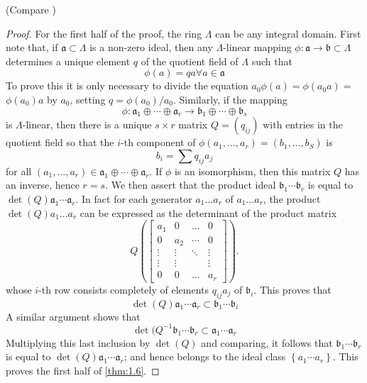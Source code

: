 (Compare \cite{kaplansky:1952})

\begin{proof}
For the first half of the proof, the ring $\Lambda$ can be any integral domain. First note that, if $\mathfrak{a} \subset \Lambda$ is a non-zero ideal, then any $\Lambda$-linear mapping $\phi: \mathfrak{a} \to \mathfrak{b} \subset \Lambda$ determines a unique element $q$ of the quotient field of $\Lambda$ such that
\[
	\phi(a)=q a \forall a \in \mathfrak{a}
\]
To prove this it is only necessary to divide the equation $a_{0} \phi(a)=\phi\left(a_{0} a\right)=$ $\phi\left(a_{0}\right) a$ by $a_{0}$, setting $q=\phi\left(a_{0}\right) / a_{0}$. Similarly, if the mapping
\[
\phi: \mathfrak{a}_{1} \oplus \cdots \oplus \mathfrak{a}_{r} \to \mathfrak{b}_{1} \oplus \cdots \oplus \mathfrak{b}_{s}
\]
is $\Lambda$-linear, then there is a unique $s \times r$ matrix $Q=\left(q_{ij}\right)$ with entries in the quotient field so that the $i$-th component of $\phi\left(a_{1}, \ldots, a_{r}\right)=\left(b_{1}, \ldots, b_{S}\right)$ is
\[
b_{i}=\sum q_{i j} a_{j}
\]
for all $\left(a_{1}, \ldots, a_{r}\right) \in \mathfrak{a}_{1} \oplus \cdots \oplus \mathfrak{a}_{r}$. If $\phi$ is an isomorphism, then this matrix $Q$ has an inverse, hence $r=s$. We then assert that the product ideal $\mathfrak{b}_{1} \cdots \mathfrak{b}_{r}$ is equal to $\det(Q) \mathfrak{a}_{1} \cdots \mathfrak{a}_{r}$. In fact for each generator $a_{1} \ldots a_{r}$ of $a_{1} \ldots a_{r}$, the product $\det(Q) a_{1} \ldots a_{r}$ can be expressed as the determinant of the product matrix
\[
Q
\left(\begin{bmatrix}
a_{1} & 0 & \ldots & 0 \\
0 & a_{2} & \cdots & 0 \\
\vdots & \vdots & \ddots & \vdots \\
\vdots & \vdots & & \vdots \\
0 & 0 & \ldots & a_{r}
\end{bmatrix}\right).
\]
whose $i$-th row consists completely of elements $q_{i j} a_{j}$ of $\mathfrak{b}_{i}$. This proves that
\[
	\det(Q) \mathfrak{a}_{1} \cdots \mathfrak{a}_{r} \subset \mathfrak{b}_{1} \cdots \mathfrak{b}_{i}
\]
A similar argument shows that
\[
\det(Q^{-1} \mathfrak{b}_{1} \cdots \mathfrak{b}_{r} \subset \mathfrak{a}_{1} \cdots \mathfrak{a}_{r}
\]
Multiplying this last inclusion by $\det(Q)$ and comparing, it follows that $\mathfrak{b}_{1} \cdots \mathfrak{b}_{r}$ is equal to $\det(Q) \mathfrak{a}_{1} \cdots \mathfrak{a}_{r}$; and hence belongs to the ideal class $\left\{a_{1} \cdots a_{r}\right\}$. This proves the first half of \autoref{thm:1.6}.


\end{proof}

